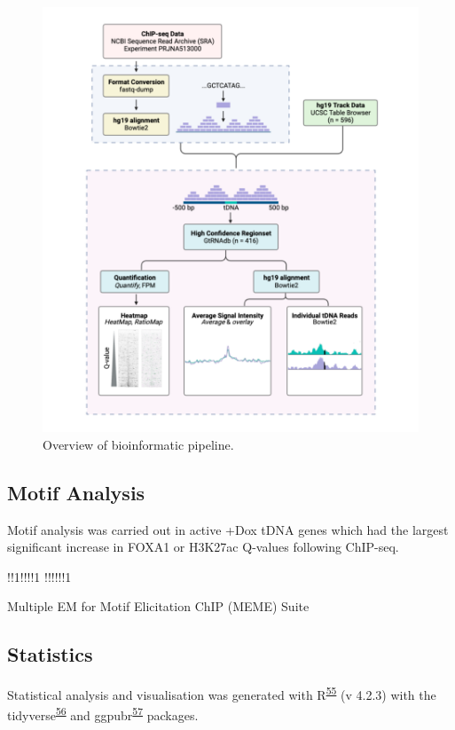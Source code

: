 \documentclass[
  12pt,
]{article}
\begin{document}
\begin{figure}[p]
\includegraphics[width=1\linewidth]{../images/methods} \caption{Overview of bioinformatic pipeline. }\label{fig:methods}
\end{figure}

\hypertarget{motif-analysis}{%
\subsection{Motif Analysis}\label{motif-analysis}}

Motif analysis was carried out in active +Dox tDNA genes which had the largest significant increase in FOXA1 or H3K27ac Q-values following ChIP-seq.

!!1!!!!1
!!!!!!1

Multiple EM for Motif Elicitation ChIP (MEME) Suite

\hypertarget{statistics}{%
\subsection{Statistics}\label{statistics}}

Statistical analysis and visualisation was generated with R\textsuperscript{\protect\hyperlink{ref-r}{55}} (v 4.2.3) with the tidyverse\textsuperscript{\protect\hyperlink{ref-wickham2019}{56}} and ggpubr\textsuperscript{\protect\hyperlink{ref-ggpubr}{57}} packages.
\end{document}
